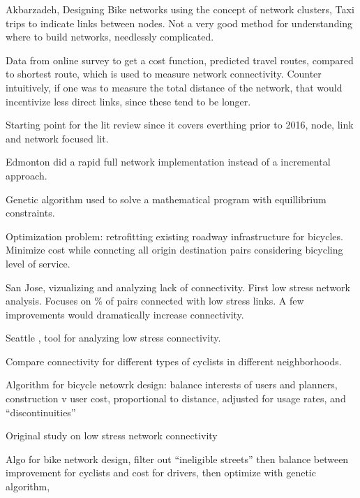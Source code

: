 \documentclass[11pt]{article} %
\begin{document}
Akbarzadeh, Designing Bike networks using the concept of network clusters, Taxi trips to indicate links between nodes. Not a very good method for understanding where to build networks, needlessly complicated. \cite{akbarzadeh2018designing}


Data from online survey to get a cost function, predicted travel routes, compared to shortest route, which is used to measure network connectivity. 
Counter intuitively, if one was to measure the total distance of the network, that would incentivize less direct links, since these tend to be longer.  
\cite{boisjoly2019bicycle} 

Starting point for the lit review since it covers everthing prior to 2016, node, link and network focused lit. 
\cite{buehler2016bikeway}


Edmonton did a rapid full network implementation instead of a incremental approach. 
\cite{cabral2019low}

Genetic algorithm used to solve a mathematical program with equillibrium constraints. 
\cite{doorley2019designing}


Optimization problem: retrofitting existing roadway infrastructure for bicycles. Minimize cost while conncting all origin destination pairs considering bicycling level of service. 
\cite{duthie2014optimization}


San Jose, vizualizing and analyzing lack of connectivity. 
First low stress network analysis. Focuses on \% of pairs connected with low stress links. A few improvements would dramatically increase connectivity. 
\cite{furth2016network}


Seattle , tool for analyzing low stress connectivity. 
\cite{lowry2016prioritizing}

Compare connectivity for different types of cyclists in different neighborhoods. 
\cite{lowry2017quantifying}

Algorithm for bicycle netowrk design: balance interests of users and planners, construction v user cost, proportional to distance, adjusted for usage rates, and ``discontinuities'' 
\cite{mauttone2017bicycle}

Original study on low stress network connectivity
\cite{mekuria2012low}


Algo for bike network design, filter out ``ineligible streets'' then balance between improvement for cyclists and cost for drivers, then optimize with genetic algorithm, 
\cite{mesbah2012bilevel}
\end{document}
